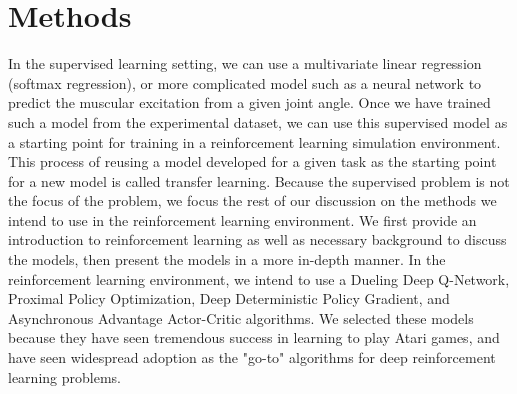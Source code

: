 \documentclass[journal,onecolumn]{IEEEtran}
\begin{document}
\section{Methods}
In the supervised learning setting, we can use a multivariate linear regression (softmax regression), or more complicated model such as a neural network to predict the muscular excitation from a given joint angle. Once we have trained such a model from the experimental dataset, we can use this supervised model as a starting point for training in a reinforcement learning simulation environment. This process of reusing a model developed for a given task as the starting point for a new model is called transfer learning. Because the supervised problem is not the focus of the problem, we focus the rest of our discussion on the methods we intend to use in the reinforcement learning environment. We first provide an introduction to reinforcement learning as well as necessary background to discuss the models, then present the models in a more in-depth manner. In the reinforcement learning environment, we intend to use a Dueling Deep Q-Network, Proximal Policy Optimization, Deep Deterministic Policy Gradient, and Asynchronous Advantage Actor-Critic algorithms. We selected these models because they have seen tremendous success in learning to play Atari games, and have seen widespread adoption as the "go-to" algorithms for deep reinforcement learning problems.  
\end{document}

